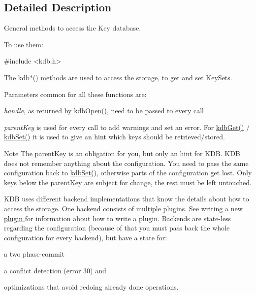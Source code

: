 \subsection{Detailed Description}
General methods to access the Key database. 

To use them\+: 
\begin{DoxyCode}
\textcolor{preprocessor}{#include <kdb.h>}
\end{DoxyCode}


The kdb$\ast$() methods are used to access the storage, to get and set \hyperlink{group__keyset}{Key\+Sets}.

Parameters common for all these functions are\+:


\begin{DoxyItemize}
\item {\itshape handle}, as returned by \hyperlink{group__kdb_ga6808defe5870f328dd17910aacbdc6ca}{kdb\+Open()}, need to be passed to every call
\item {\itshape parent\+Key} is used for every call to add warnings and set an error. For \hyperlink{group__kdb_ga28e385fd9cb7ccfe0b2f1ed2f62453a1}{kdb\+Get()} / \hyperlink{group__kdb_ga11436b058408f83d303ca5e996832bcf}{kdb\+Set()} it is used to give an hint which keys should be retrieved/stored.
\end{DoxyItemize}

\begin{DoxyNote}{Note}
The parent\+Key is an obligation for you, but only an hint for K\+D\+B. K\+D\+B does not remember anything about the configuration. You need to pass the same configuration back to \hyperlink{group__kdb_ga11436b058408f83d303ca5e996832bcf}{kdb\+Set()}, otherwise parts of the configuration get lost. Only keys below the parent\+Key are subject for change, the rest must be left untouched.
\end{DoxyNote}
K\+D\+B uses different backend implementations that know the details about how to access the storage. One backend consists of multiple plugins. See \hyperlink{group__plugin}{writing a new plugin } for information about how to write a plugin. Backends are state-\/less regarding the configuration (because of that you must pass back the whole configuration for every backend), but have a state for\+:


\begin{DoxyItemize}
\item a two phase-\/commit
\item a conflict detection (error 30) and
\item optimizations that avoid redoing already done operations.
\end{DoxyItemize}


